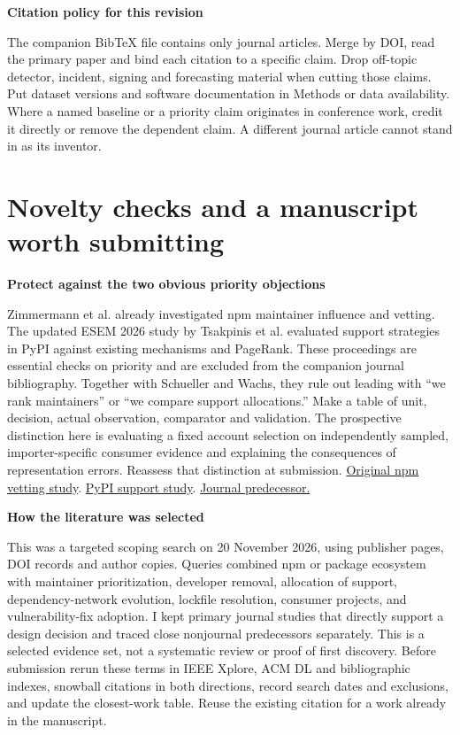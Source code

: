 \documentclass[11pt,a4paper]{article}
\newcommand{\pg}[1]{\newpage\section{\color{ink}#1}}
\newcommand{\hd}[1]{\par\textbf{\color{accent}#1}\par\nopagebreak}
\newcommand{\doi}[2]{\href{https://doi.org/#1}{#2}}
\begin{document}
\normalsize
\hd{Citation policy for this revision}
The companion BibTeX file contains only journal articles. Merge by DOI, read the primary paper and bind each citation to a specific claim. Drop off-topic detector, incident, signing and forecasting material when cutting those claims. Put dataset versions and software documentation in Methods or data availability. Where a named baseline or a priority claim originates in conference work, credit it directly or remove the dependent claim. A different journal article cannot stand in as its inventor.

\pg{Novelty checks and a manuscript worth submitting}
\hd{Protect against the two obvious priority objections}
Zimmermann et al. already investigated npm maintainer influence and vetting. The updated ESEM 2026 study by Tsakpinis et al. evaluated support strategies in PyPI against existing mechanisms and PageRank. These proceedings are essential checks on priority and are excluded from the companion journal bibliography. Together with Schueller and Wachs, they rule out leading with “we rank maintainers” or “we compare support allocations.” Make a table of unit, decision, actual observation, comparator and validation. The prospective distinction here is evaluating a fixed account selection on independently sampled, importer-specific consumer evidence and explaining the consequences of representation errors. Reassess that distinction at submission. \href{https://www.usenix.org/conference/usenixsecurity19/presentation/zimmerman}{Original npm vetting study}. \href{https://drops.dagstuhl.de/entities/document/10.4230/LIPIcs.ESEM.2026.2}{PyPI support study}. \doi{10.1177/26339137241231912}{Journal predecessor.}

\hd{How the literature was selected}
This was a targeted scoping search on 20 November 2026, using publisher pages, DOI records and author copies. Queries combined npm or package ecosystem with maintainer prioritization, developer removal, allocation of support, dependency-network evolution, lockfile resolution, consumer projects, and vulnerability-fix adoption. I kept primary journal studies that directly support a design decision and traced close nonjournal predecessors separately. This is a selected evidence set, not a systematic review or proof of first discovery. Before submission rerun these terms in IEEE Xplore, ACM DL and bibliographic indexes, snowball citations in both directions, record search dates and exclusions, and update the closest-work table. Reuse the existing citation for a work already in the manuscript.
\end{document}

